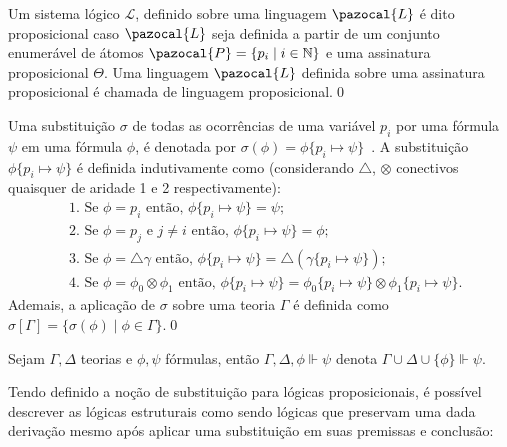 \begin{definicao}
    \label{def:proposicional}
    Um sistema lógico $\mathcal{L}$, definido sobre uma linguagem $\pazocal{L}$ é dito proposicional caso $\pazocal{L}$ seja definida a partir de um conjunto enumerável de átomos $\pazocal{P} = \{p_{i} \;| \; i \in \mathbb{N} \}$ e uma assinatura proposicional $\Theta$. Uma linguagem $\pazocal{L}$ definida sobre uma assinatura proposicional é chamada de linguagem proposicional.\qed{}
\end{definicao}

\begin{definicao}[Substituição]
    Uma substituição $\sigma$ de todas as ocorrências de uma variável $p_{i}$ por uma fórmula $\psi$ em uma fórmula $\phi$, é denotada por $\sigma(\phi) = \phi\{p_{i} \mapsto \psi\}$~\cite{dedo}. A substituição $\phi\{p_{i} \mapsto \psi\}$ é definida indutivamente como (considerando $\triangle$, $\otimes$ conectivos quaisquer de aridade 1 e 2 respectivamente):
    \begin{align*}
         & \text{1.~Se }\phi = p_{i} \text{ então, } \phi\{p_{i} \mapsto \psi\} = \psi;                                                                                             \\
         & \text{2.~Se }\phi = p_{j} \text{ e } j \neq i \text{ então, }\phi\{p_{i} \mapsto \psi\} = \phi;                                                                          \\
         & \text{3.~Se }\phi = \triangle \gamma \text{ então, } \phi\{p_{i} \mapsto \psi\} = \triangle(\gamma\{p_{i} \mapsto \psi\});                                                 \\
         & \text{4.~Se }\phi = \phi_{0} \otimes \phi_{1} \text{ então, } \phi\{p_{i} \mapsto \psi\} = \phi_{0}\{p_{i} \mapsto \psi\} \otimes \phi_{1}\{p_{i} \mapsto \psi\}.
    \end{align*}
    Ademais, a aplicação de $\sigma$ sobre uma teoria $\Gamma$ é definida como $\sigma[\Gamma] = \{\sigma(\phi) \; | \; \phi \in \Gamma\}$.\qed{}
\end{definicao}

\begin{notacao}
    Sejam $\Gamma, \Delta$ teorias e $\phi, \psi$ fórmulas, então $\Gamma, \Delta, \phi \Vdash \psi$ denota $\Gamma \cup \Delta \cup \{\phi\} \Vdash \psi$.
\end{notacao}

Tendo definido a noção de substituição para lógicas proposicionais, é possível descrever as lógicas estruturais como sendo lógicas que preservam uma dada derivação mesmo após aplicar uma substituição em suas premissas e conclusão:

